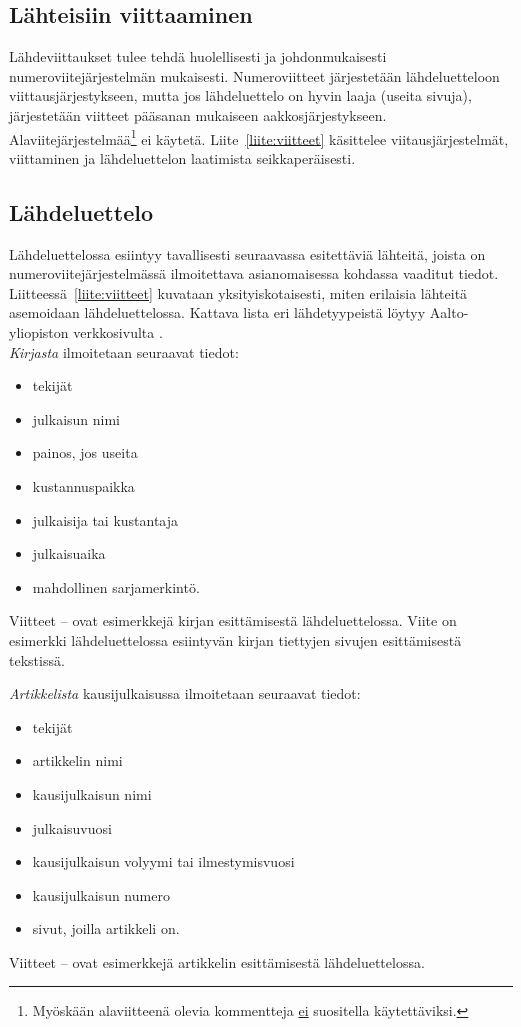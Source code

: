 \documentclass[finnish, 12pt, a4paper, arts, utf8, a-2b, online]{aaltothesis}
\begin{document}
\subsection{Lähteisiin viittaaminen}

Lähdeviittaukset tulee tehdä huolellisesti ja johdonmukaisesti
numeroviitejärjestelmän mukaisesti. Numeroviitteet järjestetään lähdeluetteloon 
viittausjärjestykseen, mutta jos lähdeluettelo on hyvin laaja (useita sivuja), 
järjestetään viitteet pääsanan mukaiseen aakkosjärjestykseen. 
Alaviitejärjestelmää\footnote{Myöskään alaviitteenä olevia kommentteja 
\underline{ei} suositella käytettäviksi.} ei käytetä. Liite~\ref{liite:viitteet}
käsittelee viitausjärjestelmät, viittaminen ja lähdeluettelon laatimista 
seikkaperäisesti. 

\subsection{Lähdeluettelo} 

Lähdeluettelossa esiintyy tavallisesti seuraavassa esitettäviä lähteitä, joista 
on numeroviitejärjestelmässä ilmoitettava asianomaisessa kohdassa vaaditut 
tiedot. Liitteessä~\ref{liite:viitteet} kuvataan yksityiskotaisesti, miten 
erilaisia lähteitä asemoidaan lähdeluettelossa. Kattava lista eri lähdetyypeistä 
löytyy Aalto-yliopiston verkkosivulta \cite{aaltolib}.\\

\noindent
\textit{Kirjasta} ilmoitetaan seuraavat tiedot:
\begin{itemize}
\setlength{\itemsep}{-3pt}
	\item[--]tekijät 
	\item[--]julkaisun nimi
	\item[--]painos, jos useita
	\item[--]kustannuspaikka
	\item[--]julkaisija tai kustantaja
	\item[--]julkaisuaika
	\item[--]mahdollinen sarjamerkintö. 
\end{itemize}
Viitteet \cite{Kauranen}--\cite{Koblitz} ovat esimerkkejä kirjan esittämisestä 
lähdeluettelossa. Viite \cite[s.\ 83--124]{Koblitz} on esimerkki 
lähdeluettelossa esiintyvän kirjan tiettyjen sivujen esittämisestä tekstissä.

\noindent
\textit{Artikkelista} kausijulkaisussa ilmoitetaan seuraavat tiedot:
\begin{itemize}
\setlength{\itemsep}{-3pt}
	\item[--]tekijät
	\item[--]artikkelin nimi
	\item[--]kausijulkaisun nimi
	\item[--]julkaisuvuosi
	\item[--]kausijulkaisun volyymi tai ilmestymisvuosi
	\item[--]kausijulkaisun numero
	\item[--]sivut, joilla artikkeli on.
\end{itemize}
Viitteet \cite{bcs}--\cite{Deschamps} ovat esimerkkejä artikkelin esittämisestä 
lähdeluettelossa.
\end{document}
